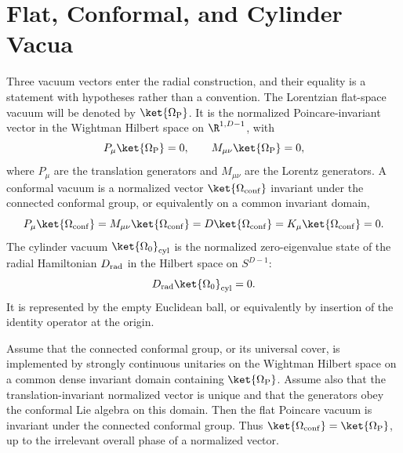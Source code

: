 \section{Flat, Conformal, and Cylinder Vacua}
\label{sec:flat-conformal-cylinder-vacua}

Three vacuum vectors enter the radial construction, and their equality is a
statement with hypotheses rather than a convention.  The Lorentzian flat-space
vacuum will be denoted by \(\ket{\Omega_{\rm P}}\).  It is the normalized
Poincare-invariant vector in the Wightman Hilbert space on
\(\R^{1,D-1}\), with
\[
  P_\mu\ket{\Omega_{\rm P}}=0,
  \qquad
  M_{\mu\nu}\ket{\Omega_{\rm P}}=0,
\]
where \(P_\mu\) are the translation generators and \(M_{\mu\nu}\) are the
Lorentz generators.  A conformal vacuum is a normalized vector
\(\ket{\Omega_{\rm conf}}\) invariant under the connected conformal group, or
equivalently on a common invariant domain,
\[
  P_\mu\ket{\Omega_{\rm conf}}
  =
  M_{\mu\nu}\ket{\Omega_{\rm conf}}
  =
  D\ket{\Omega_{\rm conf}}
  =
  K_\mu\ket{\Omega_{\rm conf}}
  =
  0 .
\]
The cylinder vacuum \(\ket{\Omega_0}_{\rm cyl}\) is the normalized
zero-eigenvalue state of the radial Hamiltonian \(D_{\rm rad}\) in the Hilbert
space on \(S^{D-1}\):
\[
  D_{\rm rad}\ket{\Omega_0}_{\rm cyl}=0 .
\]
It is represented by the empty Euclidean ball, or equivalently by insertion of
the identity operator at the origin.

\begin{proposition}
\label{prop:poincare-vacuum-is-conformal-vacuum}
Assume that the connected conformal group, or its universal cover, is
implemented by strongly continuous unitaries on the Wightman Hilbert space on a
common dense invariant domain containing \(\ket{\Omega_{\rm P}}\).  Assume also
that the translation-invariant normalized vector is unique and that the
generators obey the conformal Lie algebra on this domain.  Then the flat
Poincare vacuum is invariant under the connected conformal group.  Thus
\(\ket{\Omega_{\rm conf}}=\ket{\Omega_{\rm P}}\), up to the irrelevant overall
phase of a normalized vector.
\end{proposition}

